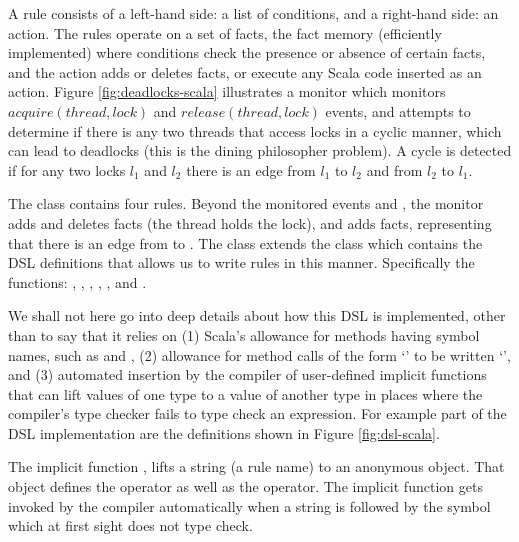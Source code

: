 \noindent
A rule consists of a left-hand side: a list of conditions, and a right-hand side:
an action. The rules operate on a set of facts, the fact memory (efficiently implemented) 
where conditions check the presence or absence of certain facts, and the action adds or deletes 
facts, or execute any Scala code inserted as an action. Figure \ref{fig:deadlocks-scala} illustrates 
a monitor which monitors $acquire(thread,lock)$ and $release(thread,lock)$ events,
and attempts to determine if there is any two threads that access locks
in a cyclic manner, which can lead to deadlocks (this is the dining philosopher problem). 
A cycle is detected if for any two locks $l_1$ and $l_2$ there is an edge from
$l_1$ to $l_2$ and from $l_2$ to $l_1$.

The class contains four rules. Beyond the monitored events
 and , the monitor adds 
and deletes  facts (the thread holds
the lock), and adds  facts, representing
that there is an edge from  to .
The class extends the  class which contains the
DSL definitions that allows us to write rules in this manner.
Specifically the functions: \iscala{--}, \iscala{&}, \iscala{|->},
, , and . 

We shall not here go into deep details about how this DSL is 
implemented, other than to say that it relies on (1) Scala's
allowance for methods having symbol names, such as \iscala{--}
and \iscala{|->}, (2) allowance for method calls of the form 
`' to be written 
`', and (3) automated insertion by 
the compiler of 
user-defined implicit functions that can lift values of one type 
to a value of another type in places where the compiler's type 
checker fails to type check an expression. For example part of
the DSL implementation are the definitions shown in Figure
\ref{fig:dsl-scala}.

The implicit function , lifts a string (a
rule name) to an anonymous object. That object defines the 
\iscala{&} operator as well as the
\iscala{|->} operator. The implicit function  
gets invoked by the compiler automatically when a string is 
followed by the symbol \iscala{--} which at first sight does not
type check.

